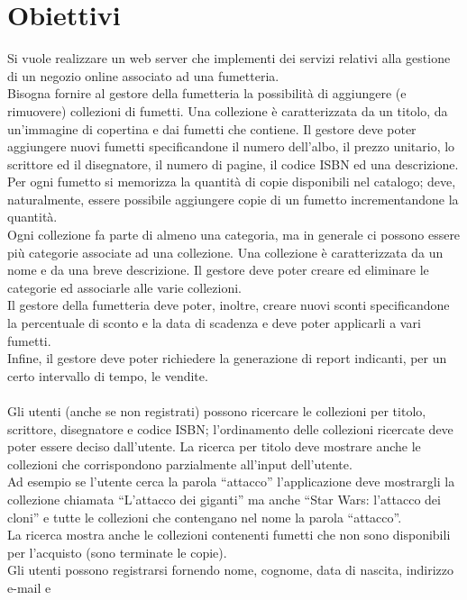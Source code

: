 \documentclass{scrreprt}
\begin{document}
\section{Obiettivi}\label{obiettivi}
Si vuole realizzare un web server che implementi dei servizi relativi alla gestione di un negozio online
associato ad una fumetteria.
\\[5pt]
Bisogna fornire al gestore della fumetteria la possibilità di aggiungere (e rimuovere) collezioni
di fumetti. Una collezione è caratterizzata da un titolo, da un'immagine di copertina e dai fumetti che
contiene. Il gestore deve poter aggiungere nuovi fumetti specificandone il numero dell'albo, il prezzo
unitario, lo scrittore ed il disegnatore, il numero di pagine, il codice ISBN ed una descrizione.
Per ogni fumetto si memorizza la quantità di copie disponibili nel catalogo; deve, naturalmente, essere
possibile aggiungere copie di un fumetto incrementandone la quantità.\\
Ogni collezione fa parte di almeno una categoria, ma in generale ci possono essere più categorie associate
ad una collezione. Una collezione è caratterizzata da un nome e da una breve descrizione. Il gestore deve
poter creare ed eliminare le categorie ed associarle alle varie collezioni.\\
Il gestore della fumetteria deve poter, inoltre, creare nuovi sconti specificandone la percentuale di sconto
e la data di scadenza e deve poter applicarli a vari fumetti.\\
Infine, il gestore deve poter richiedere la generazione di report indicanti, per un certo intervallo di tempo,
le vendite.\\
\\
Gli utenti (anche se non registrati) possono ricercare le collezioni per titolo, scrittore,
disegnatore e codice ISBN; l'ordinamento delle collezioni ricercate deve poter essere deciso
dall'utente. La ricerca per titolo deve mostrare anche le collezioni che corrispondono parzialmente
all’input dell’utente.\\
Ad esempio se l’utente cerca la parola “attacco” l’applicazione deve mostrargli la collezione
chiamata “L’attacco dei giganti” ma anche “Star Wars: l’attacco dei cloni” e tutte le collezioni
che contengano nel nome la parola “attacco”.\\
La ricerca mostra anche le collezioni contenenti fumetti che non sono disponibili per l'acquisto
(sono terminate le copie).\\
Gli utenti possono registrarsi fornendo nome, cognome, data di nascita, indirizzo e-mail e
\end{document}
